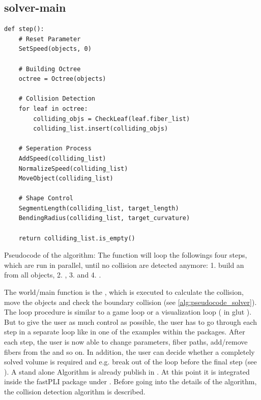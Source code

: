 \subsection{solver-main}
% 
\begin{lstfloat}[!tb]
\lstset{style=python}
\begin{lstlisting}[]
def step():
    # Reset Parameter
    SetSpeed(objects, 0)
    
    # Building Octree
    octree = Octree(objects)
    
    # Collision Detection
    for leaf in octree:
        colliding_objs = CheckLeaf(leaf.fiber_list)
        colliding_list.insert(colliding_objs)
	
    # Seperation Process
    AddSpeed(colliding_list)
    NormalizeSpeed(colliding_list)
    MoveObject(colliding_list)
	
    # Shape Control
    SegmentLength(colliding_list, target_length)
    BendingRadius(colliding_list, target_curvature)

    return colliding_list.is_empty()
\end{lstlisting}
\caption{Pseudocode of the  algorithm: The function  will loop the followings four steps, which are run in parallel, until no collision are detected anymore: 1. build an  from all objects, 2. , 3.  and 4. . }
\label{alg:pseudocode_solver}
\end{lstfloat}
% 
The world/main function is the , which is executed to calculate the collision, move the objects and check the boundary collision (see \cref{alg:pseudocode_solver}).
The loop procedure is similar to a game loop or a visualization loop (\eg{} in glut ).
But to give the user as much control as possible, the user has to go through each step in a separate loop like in one of the examples within the packages.
After each step, the user is now able to change parameters, fiber paths, add/remove fibers from the  and so on.
In addition, the user can decide whether a completely solved volume is required and e.g. break out of the loop before the final step (see \dummy{}).
%
A stand alone Algorithm is already publish in \cite{Matuschke2019}.
At this point it is integrated inside the \ac{fastPLI} package under .
Before going into the details of the algorithm, the collision detection algorithm is described.
% 
% 
% 
